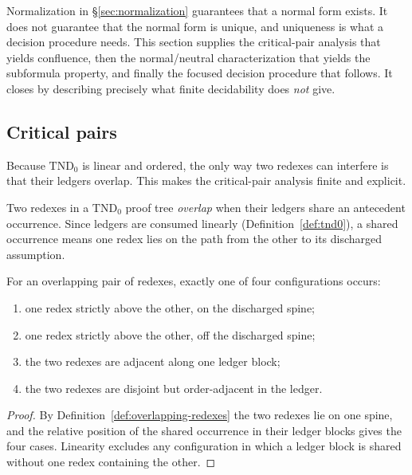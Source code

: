 \label{sec:confluence-body}

Normalization in \S\ref{sec:normalization} guarantees that a normal form exists.  It does
not guarantee that the normal form is unique, and uniqueness is what a decision procedure
needs.  This section supplies the critical-pair analysis that yields confluence, then the
normal/neutral characterization that yields the subformula property, and finally the
focused decision procedure that follows.  It closes by describing precisely what finite
decidability does \emph{not} give.

\subsection{Critical pairs}

Because $\mathrm{TND}_0$ is linear and ordered, the only way two redexes can interfere is
that their ledgers overlap.  This makes the critical-pair analysis finite and explicit.

\begin{definition}\label{def:overlapping-redexes}
Two redexes in a $\mathrm{TND}_0$ proof tree \emph{overlap} when their ledgers share an
antecedent occurrence.  Since ledgers are consumed linearly
(Definition~\ref{def:tnd0}), a shared occurrence means one redex lies on the path from the
other to its discharged assumption.
\end{definition}

\begin{proposition}\label{prop:four-paths}
For an overlapping pair of redexes, exactly one of four configurations occurs:
\begin{enumerate}
\item one redex strictly above the other, on the discharged spine;
\item one redex strictly above the other, off the discharged spine;
\item the two redexes are adjacent along one ledger block;
\item the two redexes are disjoint but order-adjacent in the ledger.
\end{enumerate}
\end{proposition}

\begin{proof}
By Definition~\ref{def:overlapping-redexes} the two redexes lie on one spine, and the
relative position of the shared occurrence in their ledger blocks gives the four cases.
Linearity excludes any configuration in which a ledger block is shared without one redex
containing the other.
\end{proof}

